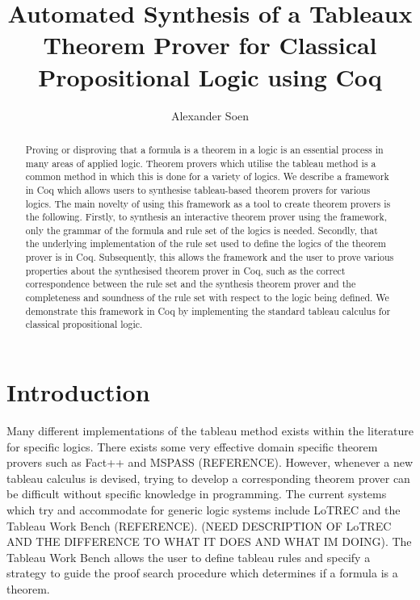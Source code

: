 \documentclass{llncs}
\begin{document}
\title{Automated Synthesis of a Tableaux Theorem Prover for Classical
Propositional Logic using Coq}

\author{Alexander Soen}

\maketitle

\begin{abstract}
Proving or disproving that a formula is a theorem in a logic is an
essential process in many areas of applied logic. Theorem provers which utilise
the tableau method is a common method in which this is done for a variety of
logics. We describe a framework in Coq which allows users to synthesise
tableau-based theorem provers for various logics. The main novelty of using
this framework as a tool to create theorem provers is the following. Firstly,
to synthesis an interactive theorem prover using the framework, only the
grammar of the formula and rule set of the logics is needed. Secondly, that the
underlying implementation of the rule set used to define the logics of the
theorem prover is in Coq. Subsequently, this allows the framework and the user
to prove various properties about the synthesised theorem prover in Coq, such
as the correct correspondence between the rule set and the synthesis theorem
prover and the completeness and soundness of the rule set with respect to the
logic being defined. We demonstrate this framework in Coq by
implementing the standard tableau calculus for classical propositional logic.
\end{abstract}

\section{Introduction}

Many different implementations of the tableau method exists within the
literature for specific logics. There exists some very effective domain
specific theorem provers such as Fact++ and MSPASS (REFERENCE). However,
whenever a new tableau calculus is devised, trying to develop a corresponding
theorem prover can be difficult without specific knowledge in programming. The
current systems which try and accommodate for generic logic systems include
LoTREC and the Tableau Work Bench (REFERENCE). (NEED DESCRIPTION OF LoTREC AND
THE DIFFERENCE TO WHAT IT DOES AND WHAT IM DOING). The Tableau Work Bench
allows the user to define tableau rules and specify a strategy to guide the
proof search procedure which determines if a formula is a theorem.
\end{document}
